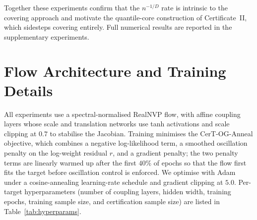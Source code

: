 \documentclass[12pt]{article}
\begin{document}
Together these experiments confirm that the $n^{-1/D}$ rate is intrinsic to the covering approach and motivate the quantile-core construction of Certificate~II, which sidesteps covering entirely.
Full numerical results are reported in the supplementary experiments.


\section{Flow Architecture and Training Details}\label{supp:architecture}

All experiments use a spectral-normalised RealNVP flow, with affine coupling layers whose scale and translation networks use tanh activations and scale clipping at $0.7$ to stabilise the Jacobian.
Training minimises the CerT-OG-Anneal objective, which combines a negative log-likelihood term, a smoothed oscillation penalty on the log-weight residual $r$, and a gradient penalty; the two penalty terms are linearly warmed up after the first $40\%$ of epochs so that the flow first fits the target before oscillation control is enforced.
We optimise with Adam under a cosine-annealing learning-rate schedule and gradient clipping at $5.0$.
Per-target hyperparameters (number of coupling layers, hidden width, training epochs, training sample size, and certification sample size) are listed in Table~\ref{tab:hyperparams}.
\end{document}
